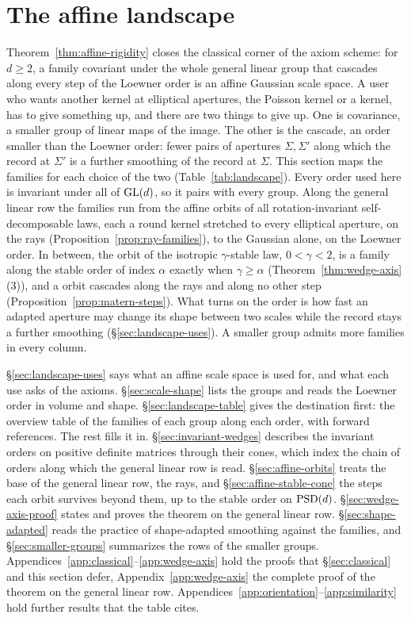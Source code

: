 \section{The affine landscape}\label{sec:landscape}

Theorem~\ref{thm:affine-rigidity} closes the classical corner of the axiom scheme: for $d \ge 2$, a
family covariant under the whole general linear group that cascades along every step of the Loewner order is an affine
Gaussian scale space. A user who wants another kernel at elliptical apertures, the Poisson kernel or a
\Matern{} kernel, has to give something up, and there are two things to give up. One is covariance, a
smaller group of linear maps of the image. The other is the cascade, an order smaller than the Loewner
order: fewer pairs of apertures $\Sigma, \Sigma'$ along which the record at $\Sigma'$ is a further
smoothing of the record at $\Sigma$. This section maps the families for each choice of the two
(Table~\ref{tab:landscape}). Every order used here is invariant under all of $\mathrm{GL}(d)$, so it pairs
with every group. Along the general linear row the families run from the affine orbits of all
rotation-invariant self-decomposable laws, each a round kernel stretched to every elliptical aperture,
on the rays (Proposition~\ref{prop:ray-families}), to the Gaussian alone, on the Loewner order. In
between, the orbit of the isotropic $\gamma$-stable law, $0 < \gamma < 2$, is a family along the
stable order of index $\alpha$ exactly when $\gamma \ge \alpha$ (Theorem~\ref{thm:wedge-axis}(3)), and
a \Matern{} orbit cascades along the rays and along no other step
(Proposition~\ref{prop:matern-steps}). What turns on the order is how fast an adapted aperture may
change its shape between two scales while the record stays a further smoothing
(\S\ref{sec:landscape-uses}). A smaller group admits more families in every column.

\S\ref{sec:landscape-uses} says what an affine scale space is used for, and what each
use asks of the axioms. \S\ref{sec:scale-shape} lists the groups and reads the Loewner order in volume
and shape. \S\ref{sec:landscape-table} gives the destination first: the overview table of the
families of each group along each order, with forward references. The rest fills it in. \S\ref{sec:invariant-wedges}
describes the invariant orders on positive definite matrices through their cones, which index the
chain of orders along which the general linear row is read. \S\ref{sec:affine-orbits} treats the base of the general linear row, the rays, and
\S\ref{sec:affine-stable-cone} the steps each orbit survives beyond them, up to the stable order on
$\mathrm{PSD}(d)$. \S\ref{sec:wedge-axis-proof} states and proves the theorem on the general linear row.
\S\ref{sec:shape-adapted} reads the practice of shape-adapted smoothing against the families, and
\S\ref{sec:smaller-groups} summarizes the rows of the smaller groups.
Appendices~\ref{app:classical}--\ref{app:wedge-axis} hold the proofs that \S\ref{sec:classical} and
this section defer, Appendix~\ref{app:wedge-axis} the complete proof of the theorem on the general
linear row. Appendices~\ref{app:orientation}--\ref{app:similarity} hold further results that the table
cites.

